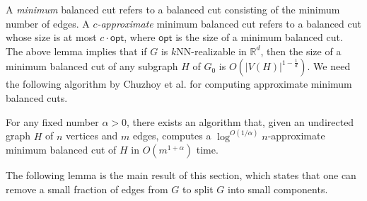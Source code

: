 \documentclass[english]{lipics-v2021}
\begin{document}
A \textit{minimum} balanced cut refers to a balanced cut consisting of the minimum number of edges.
A \textit{$c$-approximate} minimum balanced cut refers to a balanced cut whose size is at most $c \cdot \mathsf{opt}$, where $\mathsf{opt}$ is the size of a minimum balanced cut.
The above lemma implies that if $G$ is $k$NN-realizable in $\mathbb{R}^d$, then the size of a minimum balanced cut of any subgraph $H$ of $G_0$ is $O(|V(H)|^{1-\frac{1}{d}})$.
We need the following algorithm by Chuzhoy et al. for computing approximate minimum balanced cuts.
\begin{theorem} \label{thm-cut}
For any fixed number $\alpha > 0$, there exists an algorithm that, given an undirected graph $H$ of $n$ vertices and $m$ edges, computes a $\log^{O(1/\alpha)} n$-approximate minimum balanced cut of $H$ in $O(m^{1+\alpha})$ time.
\end{theorem}

The following lemma is the main result of this section, which states that one can remove a small fraction of edges from $G$ to split $G$ into small components.
\end{document}
